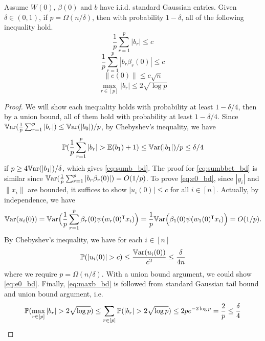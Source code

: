 \begin{lemma}
\label{lma:inqs}
Assume $W(0)$, $\beta(0)$ and $b$ have i.i.d. standard Gaussian entries. Given $\delta\in(0,1)$, if $p=\Omega(n/\delta)$, then with probability $1-\delta$, all of the following inequality hold.
\begin{equation}
\label{eq:sumb_bd}
    \frac{1}{p}\sum_{r=1}^p|b_r| \leq c
\end{equation}
\begin{equation}
\label{eq:sumbbet_bd}
    \frac{1}{p}\sum_{r=1}^p|b_r\beta_r(0)| \leq c
\end{equation}
\begin{equation}
\label{eq:e0_bd}
    \|e(0)\| \leq c\sqrt n
\end{equation}
\begin{equation}
\label{eq:maxb_bd}
    \max_{r\in[p]}|b_r|\leq 2\sqrt{\log p}
\end{equation}
\end{lemma}
\begin{proof}
We will show each inequality holds with probability at least $1-\delta/4$, then by a union bound, all of them hold with probability at least $1-\delta/4$. Since $\mathbb{V}\mathrm{ar}(\frac{1}{p}\sum_{r=1}^p|b_r|)\leq \mathbb{V}\mathrm{ar}(|b_0|)/p$, by Chebyshev's inequality, we have 
\begin{equation*}
    \operatorname{\mathbb{P}}(\frac{1}{p}\sum_{r=1}^p|b_r| > \mathbb{E}(b_1) + 1) \leq \mathbb{V}\mathrm{ar}(|b_1|)/p \leq \delta/4
\end{equation*} 
if $p\geq 4\mathbb{V}\mathrm{ar}(|b_1|)/\delta$, which gives \eqref{eq:sumb_bd}. The proof for \eqref{eq:sumbbet_bd} is similar since $\mathbb{V}\mathrm{ar}(\frac{1}{p}\sum_{r=1}^p|b_r\beta_r(0)|)=O(1/p)$. To prove \eqref{eq:e0_bd}, since $|y_i|$ and $\|x_i\|$ are bounded, it suffices to show $|u_i(0)|\leq c$ for all $i\in [n]$. Actually, by independence, we have
\begin{equation*}
    \Var(u_i(0)) = \Var \Big(\frac{1}{p}\sum_{r=1}^p \beta_r(0)\psi(w_r(0)\transpose x_i)\Big) = \frac{1}{p}\Var\Big(\beta_1(0)\psi(w_1(0)\transpose x_i)\Big) = O(1/p).
\end{equation*}
By Chebyshev's inequality, we have for each $i\in [n]$
\begin{equation*}
    \prob(|u_i(0)|> c) \leq \frac{\Var(u_i(0))}{c^2} \leq \frac{\delta}{4n}
\end{equation*}
where we require $p=\Omega(n/\delta)$. With a union bound argument, we could show \eqref{eq:e0_bd}. Finally, \eqref{eq:maxb_bd} is followed from standard Gaussian tail bound and union bound argument, i.e.
\begin{equation*}
    \operatorname{\mathbb{P}}(\max_{r\in[p]}|b_r| > 2\sqrt{\log p}) \leq \sum_{r\in [p]}\operatorname{\mathbb{P}}(|b_r| > 2\sqrt{\log p}) \leq 2pe^{-2\log p} = \frac{2}{p} \leq \frac{\delta}{4}
\end{equation*}
\end{proof}

